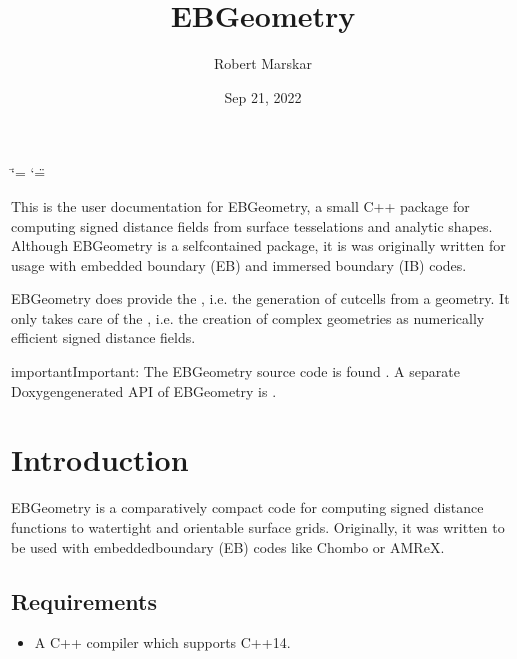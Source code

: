 \documentclass[letterpaper,10pt,english]{sphinxmanual}
\title{EBGeometry}
\date{Sep 21, 2022}
\author{Robert Marskar}
\begin{document}
\ifdefined\shorthandoff
  \ifnum\catcode`\=\string=\active\shorthandoff{=}\fi
  \ifnum\catcode`\"=\active{}\fi
\fi

\pagestyle{empty}
\sphinxmaketitle
\pagestyle{plain}
\sphinxtableofcontents
\pagestyle{normal}
\label{\detokenize{index::doc}}


\sphinxAtStartPar
This is the user documentation for EBGeometry, a small C++ package for computing signed distance fields from surface tesselations and analytic shapes.
Although EBGeometry is a self\sphinxhyphen{}contained package, it is was originally written for usage with embedded boundary (EB) and immersed boundary (IB) codes.

\sphinxAtStartPar
EBGeometry does provide the , i.e. the generation of cut\sphinxhyphen{}cells from a geometry.
It only takes care of the , i.e. the creation of complex geometries as numerically efficient signed distance fields.

\begin{sphinxadmonition}{important}{Important:}
\sphinxAtStartPar
The EBGeometry source code is found .
A separate Doxygen\sphinxhyphen{}generated API of EBGeometry is .
\end{sphinxadmonition}




\chapter{Introduction}
\label{\detokenize{index:introduction}}
\sphinxstepscope
{}\label{\detokenize{Introduction:chap-introduction}}
\sphinxAtStartPar
EBGeometry is a comparatively compact code for computing signed distance functions to watertight and orientable surface grids.
Originally, it was written to be used with embedded\sphinxhyphen{}boundary (EB) codes like Chombo or AMReX.


\section{Requirements}
\label{\detokenize{Introduction:requirements}}\label{\detokenize{Introduction::doc}}\begin{itemize}
\item {} 
\sphinxAtStartPar
A C++ compiler which supports C++14.

\end{itemize}
\end{document}

